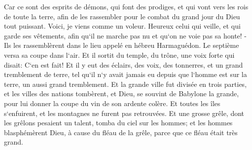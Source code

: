 \verse Car ce sont des esprits de démons, qui font des prodiges, et qui vont vers les rois de toute la terre, afin de les rassembler pour le combat du grand jour du Dieu tout puissant. 
\verse Voici, je viens comme un voleur. Heureux celui qui veille, et qui garde ses vêtements, afin qu`il ne marche pas nu et qu`on ne voie pas sa honte! - 
\verse Ils les rassemblèrent dans le lieu appelé en hébreu Harmaguédon. 
\verse Le septième versa sa coupe dans l`air. Et il sortit du temple, du trône, une voix forte qui disait: C`en est fait! 
\verse Et il y eut des éclairs, des voix, des tonnerres, et un grand tremblement de terre, tel qu`il n`y avait jamais eu depuis que l`homme est sur la terre, un aussi grand tremblement. 
\verse Et la grande ville fut divisée en trois parties, et les villes des nations tombèrent, et Dieu, se souvint de Babylone la grande, pour lui donner la coupe du vin de son ardente colère. 
\verse Et toutes les îles s`enfuirent, et les montagnes ne furent pas retrouvées. 
\verse Et une grosse grêle, dont les grêlons pesaient un talent, tomba du ciel sur les hommes; et les hommes blasphémèrent Dieu, à cause du fléau de la grêle, parce que ce fléau était très grand. 

